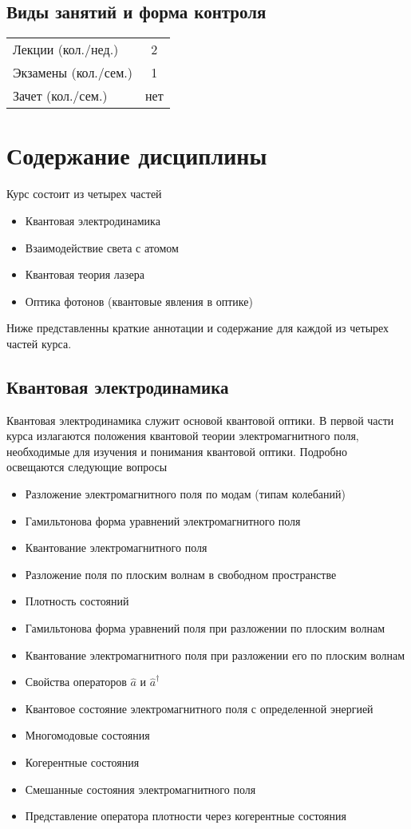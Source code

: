 \subsection{Виды занятий и форма контроля}
\begin{longtable}{|l|c|}
\hline
Лекции (кол./нед.) & 2 \\ 
Экзамены (кол./сем.)& 1 \\
Зачет (кол./сем.)& нет \\ \hline
\end{longtable}

\section{Содержание дисциплины}
Курс состоит из четырех частей
\begin{itemize}
\item Квантовая электродинамика
\item Взаимодействие света с атомом
\item Квантовая теория лазера
\item Оптика фотонов (квантовые явления в оптике)
\end{itemize}

Ниже представленны краткие аннотации и содержание для каждой из
четырех частей курса.

\subsection{Квантовая электродинамика}
Квантовая электродинамика служит основой квантовой оптики. В первой
части курса излагаются положения квантовой теории электромагнитного поля,
необходимые для изучения и понимания квантовой оптики. Подробно
освещаются следующие вопросы
\begin{itemize}
\item Разложение электромагнитного поля по модам (типам колебаний)
\item Гамильтонова форма уравнений электромагнитного поля 
\item Квантование электромагнитного поля 
\item Разложение поля по плоским волнам в свободном пространстве 
\item Плотность состояний 
\item Гамильтонова форма уравнений поля при разложении по плоским
  волнам 
\item Квантование электромагнитного поля при разложении его по
  плоским волнам 
\item Свойства операторов $ \hat a $ и $ \hat a ^\dag $ 
\item Квантовое состояние электромагнитного поля  с определенной
  энергией 
\item Многомодовые состояния 
\item Когерентные состояния 
\item Смешанные состояния электромагнитного поля 
\item Представление оператора плотности через когерентные
  состояния 
\end{itemize}

